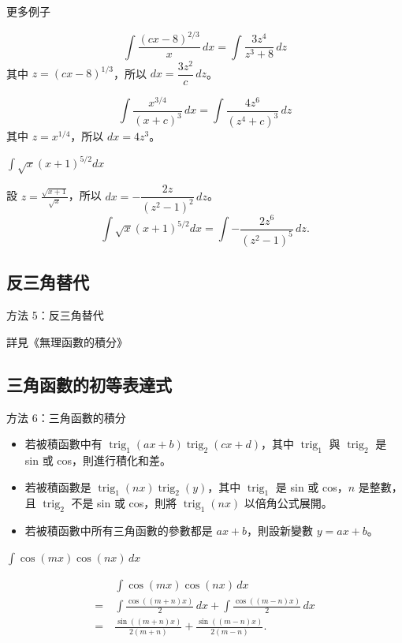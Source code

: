 \documentclass{beamer}
\newcommand{\trig}{\operatorname{trig}}
\theoremstyle{remark}
\begin{document}
\begin{CJK}{UTF8}{bsmi}
\begin{frame}{更多例子}
  \begin{example}
    \[\int \frac{\left( cx-8 \right)^{2/3}}{x}\,dx = \int \frac{3z^4}{z^3 + 8}\,dz\]
    其中 $z = \left( cx-8 \right)^{1/3}$，所以 $dx = \dfrac{3z^2}{c}\,dz$。
  \end{example}
  \begin{example}
    \[\int \frac{x^{3/4}}{\left( x+c \right)^3}\,dx = \int \frac{4z^6}{\left( z^4 + c \right)^3}\,dz\]
    其中 $z = x^{1/4}$，所以 $dx = 4z^3$。
  \end{example}
\end{frame}

\begin{frame}{$\displaystyle \int \sqrt x \left( x+1 \right)^{5/2} dx$}
  \begin{example}
    設 $\displaystyle z = \frac{\sqrt{x+1}}{\sqrt x}$，所以 $dx = -\dfrac{2z}{\left( z^2 - 1 \right)^2}\,dz$。
    \[\int \sqrt x \left( x+1 \right)^{5/2} dx = \int -\frac{2z^6}{\left( z^2 - 1 \right)^5}\,dz.\]
  \end{example}
\end{frame}

\subsection{反三角替代}
\begin{frame}{方法 5：反三角替代}
  \centerline{詳見《無理函數的積分》}
\end{frame}

\subsection[三角函數]{三角函數的初等表達式}
\begin{frame}{方法 6：三角函數的積分}
  \begin{itemize}
    \item 若被積函數中有 $\trig_1(ax+b) \trig_2(cx+d)$，其中 $\trig_1$ 與 $\trig_2$ 是 sin 或 cos，則進行積化和差。
    \item 若被積函數是 $\trig_1(nx) \trig_2(y)$，其中 $\trig_1$ 是 sin 或 cos，$n$ 是整數，且 $\trig_2$ 不是 sin 或
      cos，則將 $\trig_1(nx)$ 以倍角公式展開。
    \item 若被積函數中所有三角函數的參數都是 $ax+b$，則設新變數 $y = ax+b$。
  \end{itemize}
\end{frame}

\begin{frame}{$\displaystyle \int \cos(mx) \cos(nx)\,dx$}
  \begin{solution}
    \begin{align*}
	 & \int \cos(mx) \cos(nx)\,dx\\
      =\:& \int \frac{\cos((m+n)x)}{2}\,dx + \int \frac{\cos((m-n)x)}{2}\,dx\\
      =\:& \frac{\sin((m+n)x)}{2 \left( m+n \right)} + \frac{\sin((m-n)x)}{2 \left( m-n \right)}.
    \end{align*}
  \end{solution}
\end{frame}


\end{CJK}
\end{document}
